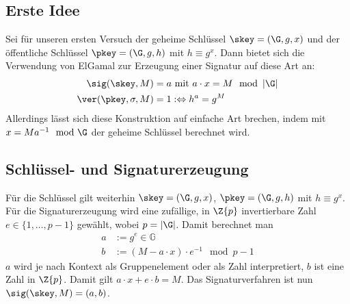 \subsection{Erste Idee}
Sei für unseren ersten Versuch der geheime Schlüssel $\skey = (\G, g,
x)$ und der öffentliche Schlüssel $\pkey = (\G, g, h)$ mit $h \equiv g^{x}$. Dann bietet
sich die Verwendung von ElGamal zur Erzeugung einer Signatur auf diese
Art an: 
\begin{align*}
\sig(\skey,M) &= a \text{ mit } a \cdot x = M \mod \left|\G\right|\\
\ver(\pkey,\sigma,M) &= 1 :\Leftrightarrow h^a = g^M
\end{align*}
Allerdings lässt sich diese Konstruktion auf einfache Art brechen, indem
mit $x = M a^{-1} \mod \G$ der geheime Schlüssel berechnet wird. 

\subsection{Schlüssel- und Signaturerzeugung}
Für die Schlüssel gilt weiterhin $\skey = (\G, g,
x)$, $\pkey = (\G, g, h)$ mit $h \equiv g^{x}$. 
Für die Signaturerzeugung wird eine zufällige, in $\Z{p}$ invertierbare
Zahl $e \in \{1, \dots, p - 1\}$ gewählt,
wobei $p=|\G|$. Damit berechnet man 
\begin{align*}
a &:= g^e \in \mathbb{G}\\
b &:= (M - a \cdot x) \cdot e^{-1} \mod p-1
\end{align*}
$a$ wird je nach Kontext als Gruppenelement oder als Zahl interpretiert, $b$
ist eine Zahl in $\Z{p}$.  
Damit gilt $a \cdot x + e \cdot b = M$. Das Signaturverfahren ist nun
$\sig(\skey,M) = (a, b)$.

